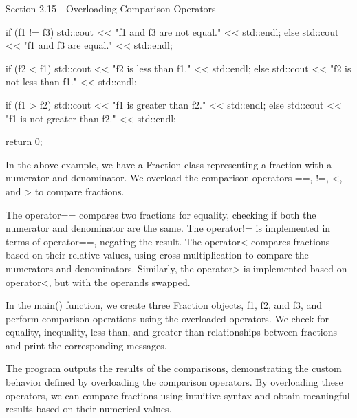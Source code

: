 \begin{notes}{Section 2.15 - Overloading Comparison Operators}
\begin{highlight}
\begin{code}[C++]
{        if (f1 != f3) {
            std::cout << "f1 and f3 are not equal." << std::endl;
        } else {
            std::cout << "f1 and f3 are equal." << std::endl;
        }
    
        if (f2 < f1) {
            std::cout << "f2 is less than f1." << std::endl;
        } else {
            std::cout << "f2 is not less than f1." << std::endl;
        }
    
        if (f1 > f2) {
            std::cout << "f1 is greater than f2." << std::endl;
        } else {
            std::cout << "f1 is not greater than f2." << std::endl;
        }
    
        return 0;
    }
    \end{code}
        In the above example, we have a Fraction class representing a fraction with a numerator and denominator. We overload the comparison operators ==, !=, <, and > to compare fractions.
    
        The operator== compares two fractions for equality, checking if both the numerator and denominator are the same. The operator!= is implemented in terms of operator==, negating the result. The operator< compares fractions based on their relative values, using cross multiplication to compare the numerators and 
        denominators. Similarly, the operator> is implemented based on operator<, but with the operands swapped.
    
        In the main() function, we create three Fraction objects, f1, f2, and f3, and perform comparison operations using the overloaded operators. We check for equality, inequality, less than, and greater than relationships between fractions and print the corresponding messages.
    
        The program outputs the results of the comparisons, demonstrating the custom behavior defined by overloading the comparison operators. By overloading these operators, we can compare fractions using intuitive syntax and obtain meaningful results based on their numerical values.
    \end{highlight}
\end{notes}

